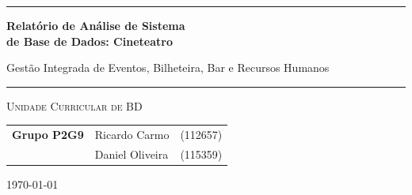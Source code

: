 \documentclass[11pt,a4paper]{article}
\begin{document}
\begin{titlepage}
    \centering
    
    \vspace*{1cm}

    {\color{secondaryColor}\rule{\linewidth}{2pt}\par}
    \vspace{0.6cm}

    {\huge \bfseries \color{primaryColor}
    Relatório de Análise de Sistema\\
    de Base de Dados: Cineteatro\par}

    \vspace{0.4cm}

    {\large \color{secondaryColor}
    Gestão Integrada de Eventos, Bilheteira, Bar e Recursos Humanos\par}

    \vspace{0.2cm}

    {\color{secondaryColor}\rule{\linewidth}{2pt}\par}

    \vspace{2cm}

    {\Large \textsc{Unidade Curricular de BD}\par}

    \vfill

    \begin{tabular}{rll}
        \textbf{Grupo P2G9} & Ricardo Carmo   & (112657) \\
                            & Daniel Oliveira & (115359)
    \end{tabular}

    \vfill

    {\large \color{textColor!70} \today\par}

    \vspace*{1cm}

\end{titlepage}

\clearpage
\tableofcontents
\clearpage

\end{document}
